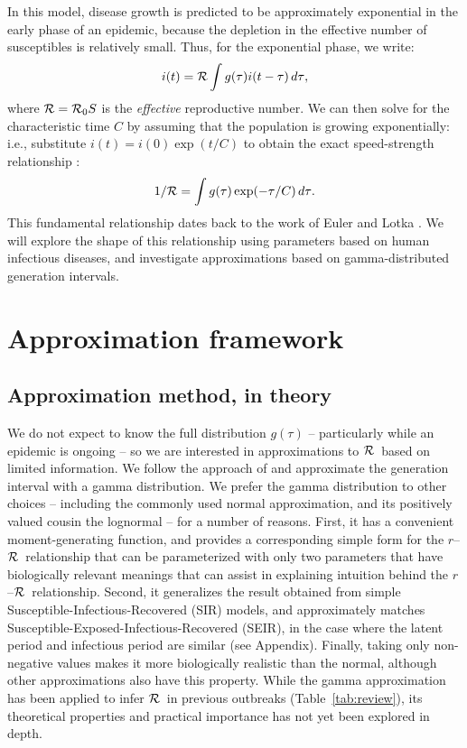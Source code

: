 \documentclass[12pt]{article}
\newcommand{\rR}{\mbox{$r$--$\cal R$}}
\newcommand{\RR}{\ensuremath{{\cal R}}}
\newcommand{\Rx}[1]{\ensuremath{{\cal R}_{#1}}}
\newcommand{\Ro}{\Rx{0}}
\newcommand{\Tc}{\ensuremath{C}}
\newcommand{\tref}[1]{Table~\ref{tab:#1}}
\begin{document}
In this model, disease growth is predicted to be approximately exponential in the early phase of an epidemic, because the depletion in the effective number of susceptibles is relatively small.
Thus, for the exponential phase, we write:
\begin{equation}
i(t) = \RR\int{g(\tau)i(t-\tau) \,d\tau},
\end{equation}
where $\RR = \Ro S$ is the \emph{effective} reproductive number.
We can then solve for the characteristic time $\Tc$ by assuming that the population is growing exponentially: i.e., substitute $i(t) = i(0) \exp(t/\Tc)$ to obtain the exact speed-strength relationship \cite{diekmann2000mathematical}:
\begin{equation}
	1/\RR = \int{g(\tau)\exp(-\tau/\Tc) \,d\tau}.\label{eq:Euler}
\end{equation}
This fundamental relationship dates back to the work of Euler and Lotka \cite{Lotka}. We will explore the shape of this relationship using parameters based on human infectious diseases, and investigate approximations based on gamma-distributed generation intervals.

\section{Approximation framework}
\label{approxframe}

\subsection{Approximation method, in theory}
We do not expect to know the full distribution $g(\tau)$ -- particularly while an epidemic is ongoing -- so we are interested in approximations to \RR\ based on limited information.
We follow the approach of \cite{NishCast09} and approximate the generation interval with a gamma distribution.
We prefer the gamma distribution to other choices -- including the commonly used normal approximation, and its positively valued cousin the lognormal -- for a number of reasons.
First, it has a convenient moment-generating function, and provides a corresponding simple form for the \rR\ relationship that can be parameterized with only two parameters that have biologically relevant meanings that can assist in explaining intuition behind the \rR\ relationship.
Second, it generalizes the result obtained from simple Susceptible-Infectious-Recovered (SIR) models, and approximately matches Susceptible-Exposed-Infectious-Recovered (SEIR), in the case where the latent period and infectious period are similar (see Appendix).
Finally, taking only non-negative values makes it more biologically realistic than the normal, although other approximations also have this property.
While the gamma approximation has been applied to infer \RR\ in previous outbreaks (\tref{review}), 
its theoretical properties and practical importance has not yet been explored in depth.
\end{document}
